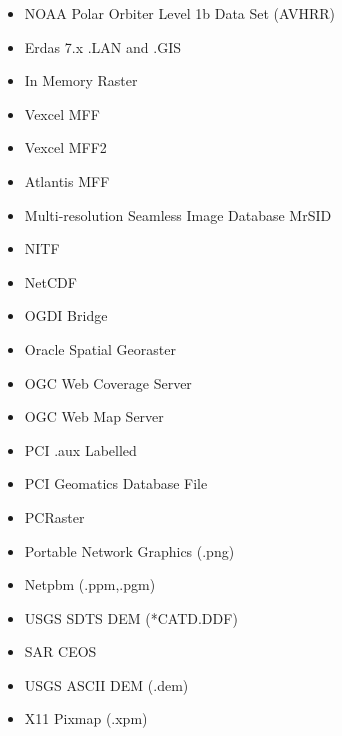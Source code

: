 \begin{itemize}
\item NOAA Polar Orbiter Level 1b Data Set (AVHRR)
\item Erdas 7.x .LAN and .GIS
\item In Memory Raster
\item Vexcel MFF
\item Vexcel MFF2
\item Atlantis MFF
\item Multi-resolution Seamless Image Database  MrSID
\item NITF
\item NetCDF
\item OGDI Bridge
\item Oracle Spatial Georaster
\item OGC Web Coverage Server
\item OGC Web Map Server
\item PCI .aux Labelled
\item PCI Geomatics Database File
\item PCRaster
\item Portable Network Graphics (.png)
\item Netpbm (.ppm,.pgm)
\item USGS SDTS DEM (*CATD.DDF)
\item SAR CEOS
\item USGS ASCII DEM (.dem)
\item X11 Pixmap (.xpm)

\end{itemize}
\clearpage
